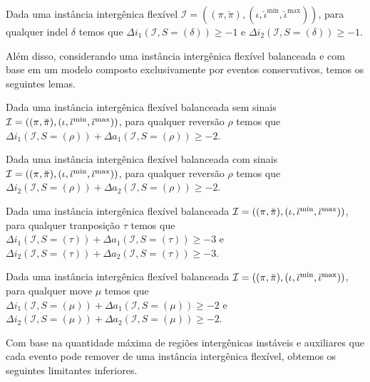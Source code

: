 \begin{lemma}\label{lemma:HQJMMZCU}
Dada uma instância intergênica flexível $\mathcal{I} = ((\pi,\breve\pi),(\iota,\breve\iota^{\min},\breve\iota^{\max}))$, para qualquer indel $\delta$ temos que $\Delta i_1(\mathcal{I}, S = (\delta)) \ge -1$ e $\Delta i_2(\mathcal{I}, S = (\delta)) \ge -1$.
\end{lemma}

Além disso, considerando uma instância intergênica flexível balanceada e com base em um modelo composto exclusivamente por eventos conservativos, temos os seguintes lemas.

\begin{lemma}\label{lemma:IERALSKC}
Dada uma instância intergênica flexível balanceada sem sinais $\mathcal{I} = ((\pi,\breve\pi),\break(\iota,\breve\iota^{\min},\breve\iota^{\max}))$, para qualquer reversão $\rho$ temos que $\Delta i_1(\mathcal{I}, S = (\rho)) + \Delta a_1(\mathcal{I}, S = (\rho)) \ge -2$.
\end{lemma}

\begin{lemma}\label{lemma:LMCJCLQU}
Dada uma instância intergênica flexível balanceada com sinais $\mathcal{I} = ((\pi,\breve\pi),\break(\iota,\breve\iota^{\min},\breve\iota^{\max}))$, para qualquer reversão $\rho$ temos que $\Delta i_2(\mathcal{I}, S = (\rho)) + \Delta a_2(\mathcal{I}, S = (\rho)) \ge -2$.
\end{lemma}

\begin{lemma}\label{lemma:FOXQSODF}
Dada uma instância intergênica flexível balanceada $\mathcal{I} = ((\pi,\breve\pi),(\iota,\breve\iota^{\min},\break\breve\iota^{\max}))$, para qualquer tranposição $\tau$ temos que $\Delta i_1(\mathcal{I}, S = (\tau)) + \Delta a_1(\mathcal{I}, S = (\tau)) \ge -3$ e $\Delta i_2(\mathcal{I}, S = (\tau)) + \Delta a_2(\mathcal{I}, S = (\tau)) \ge -3$.
\end{lemma}

\begin{lemma}\label{lemma:AXMNYRLB}
Dada uma instância intergênica flexível balanceada $\mathcal{I} = ((\pi,\breve\pi),(\iota,\breve\iota^{\min},\break\breve\iota^{\max}))$, para qualquer move $\mu$ temos que $\Delta i_1(\mathcal{I}, S = (\mu)) + \Delta a_1(\mathcal{I}, S = (\mu)) \ge -2$ e $\Delta i_2(\mathcal{I}, S = (\mu)) + \Delta a_2(\mathcal{I}, S = (\mu)) \ge -2$.
\end{lemma}

Com base na quantidade máxima de regiões intergênicas instáveis e auxiliares que cada evento pode remover de uma instância intergênica flexível, obtemos os seguintes limitantes inferiores.

